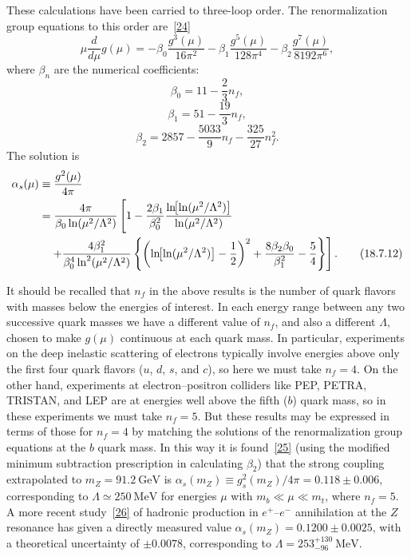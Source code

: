 These calculations have been carried to three-loop order. The renormalization group equations to this order are~\hyperref[ch18-ref-24]{[24]}
\begin{equation}
\mu\frac{d}{d\mu}g(\mu)
=-\beta_0\frac{g^3(\mu)}{16\pi^2}
-\beta_1\frac{g^5(\mu)}{128\pi^4}
-\beta_2\frac{g^7(\mu)}{8192\pi^6},
\tag{18.7.8}\label{eq:18.7.8}
\end{equation}
where $\beta_n$ are the numerical coefficients:
\begin{equation}
\beta_0=11-\frac{2}{3}n_f,
\tag{18.7.9}\label{eq:18.7.9}
\end{equation}
\begin{equation}
\beta_1=51-\frac{19}{3}n_f,
\tag{18.7.10}\label{eq:18.7.10}
\end{equation}
\begin{equation}
\beta_2=2857-\frac{5033}{9}n_f-\frac{325}{27}n_f^2.
\tag{18.7.11}\label{eq:18.7.11}
\end{equation}
The solution is
\begin{align}
\alpha_s(\mu)&\equiv\frac{g^2(\mu)}{4\pi}\notag\\
&=\frac{4\pi}{\beta_0\ln(\mu^2/\Lambda^2)}
\left[1-\frac{2\beta_1}{\beta_0^2}
\frac{\ln\!\bigl[\ln(\mu^2/\Lambda^2)\bigr]}{\ln(\mu^2/\Lambda^2)}\right.\notag\\
&\quad\left.+\frac{4\beta_1^2}{\beta_0^4\ln^2(\mu^2/\Lambda^2)}
\left\{\left(\ln\!\bigl[\ln(\mu^2/\Lambda^2)\bigr]-\frac{1}{2}\right)^2
+\frac{8\beta_2\beta_0}{\beta_1^2}-\frac{5}{4}\right\}\right].
\tag{18.7.12}\label{eq:18.7.12}
\end{align}

It should be recalled that $n_f$ in the above results is the number of quark flavors with masses below the energies of interest. In each energy range between any two successive quark masses we have a different value of $n_f$, and also a different $\Lambda$, chosen to make $g(\mu)$ continuous at each quark mass. In particular, experiments on the deep inelastic scattering of electrons typically involve energies above only the first four quark flavors ($u$, $d$, $s$, and $c$), so here we must take $n_f=4$. On the other hand, experiments at electron--positron colliders like PEP, PETRA, TRISTAN, and LEP are at energies well above the fifth ($b$) quark mass, so in these experiments we must take $n_f=5$. But these results may be expressed in terms of those for $n_f=4$ by matching the solutions of the renormalization group equations at the $b$ quark mass. In this way it is found~\hyperref[ch18-ref-25]{[25]} (using the modified minimum subtraction prescription in calculating $\beta_2$) that the strong coupling extrapolated to $m_Z=91.2\ \mathrm{GeV}$ is $\alpha_s(m_Z)\equiv g_s^2(m_Z)/4\pi=0.118\pm0.006$, corresponding to $\Lambda\simeq250\ \mathrm{MeV}$ for energies $\mu$ with $m_b\ll\mu\ll m_t$, where $n_f=5$. A more recent study~\hyperref[ch18-ref-26]{[26]} of hadronic production in $e^+$--$e^-$ annihilation at the $Z$ resonance has given a directly measured value $\alpha_s(m_Z)=0.1200\pm0.0025$, with a theoretical uncertainty of $\pm0.0078$, corresponding to $\Lambda=253^{+130}_{-96}\ \mathrm{MeV}$.
